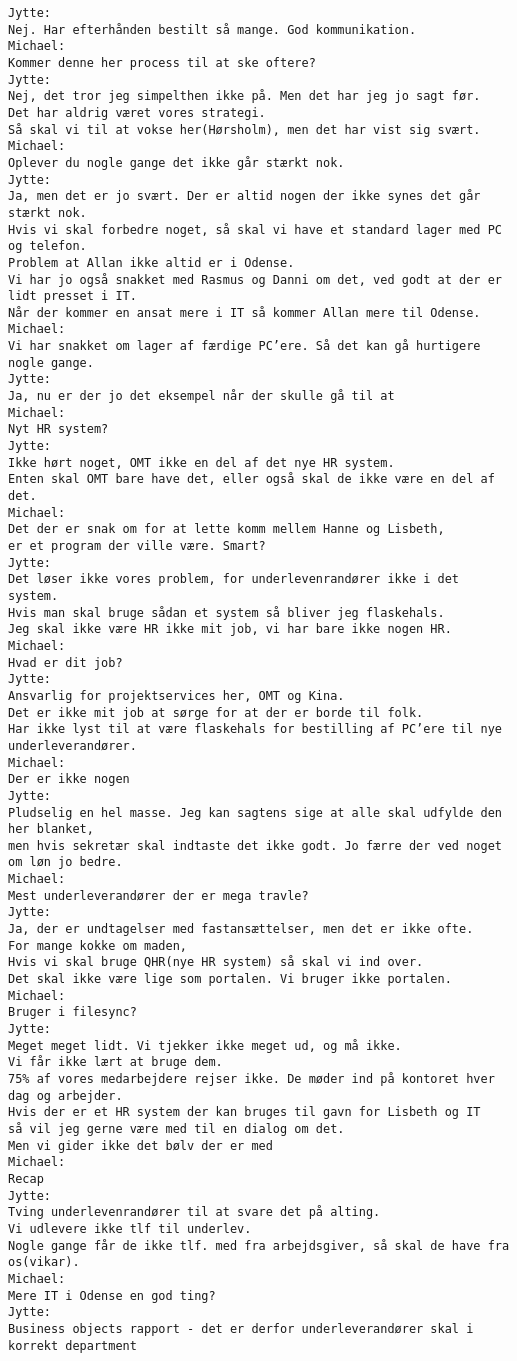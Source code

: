 \begin{verbatim}
Jytte:
Nej. Har efterhånden bestilt så mange. God kommunikation.
Michael:
Kommer denne her process til at ske oftere?
Jytte:
Nej, det tror jeg simpelthen ikke på. Men det har jeg jo sagt før.
Det har aldrig været vores strategi.
Så skal vi til at vokse her(Hørsholm), men det har vist sig svært.
Michael:
Oplever du nogle gange det ikke går stærkt nok.
Jytte:
Ja, men det er jo svært. Der er altid nogen der ikke synes det går stærkt nok.
Hvis vi skal forbedre noget, så skal vi have et standard lager med PC og telefon.
Problem at Allan ikke altid er i Odense.
Vi har jo også snakket med Rasmus og Danni om det, ved godt at der er lidt presset i IT.
Når der kommer en ansat mere i IT så kommer Allan mere til Odense.
Michael:
Vi har snakket om lager af færdige PC’ere. Så det kan gå hurtigere nogle gange.
Jytte:
Ja, nu er der jo det eksempel når der skulle gå til at 
Michael:
Nyt HR system?
Jytte:
Ikke hørt noget, OMT ikke en del af det nye HR system.
Enten skal OMT bare have det, eller også skal de ikke være en del af det.
Michael:
Det der er snak om for at lette komm mellem Hanne og Lisbeth,
er et program der ville være. Smart?
Jytte:
Det løser ikke vores problem, for underlevenrandører ikke i det system.
Hvis man skal bruge sådan et system så bliver jeg flaskehals.
Jeg skal ikke være HR ikke mit job, vi har bare ikke nogen HR. 
Michael:
Hvad er dit job?
Jytte:
Ansvarlig for projektservices her, OMT og Kina.
Det er ikke mit job at sørge for at der er borde til folk.
Har ikke lyst til at være flaskehals for bestilling af PC’ere til nye underleverandører. 
Michael:
Der er ikke nogen 
Jytte:
Pludselig en hel masse. Jeg kan sagtens sige at alle skal udfylde den her blanket,
men hvis sekretær skal indtaste det ikke godt. Jo færre der ved noget om løn jo bedre.
Michael:
Mest underleverandører der er mega travle?
Jytte:
Ja, der er undtagelser med fastansættelser, men det er ikke ofte.
For mange kokke om maden, 
Hvis vi skal bruge QHR(nye HR system) så skal vi ind over.
Det skal ikke være lige som portalen. Vi bruger ikke portalen. 
Michael:
Bruger i filesync?
Jytte:
Meget meget lidt. Vi tjekker ikke meget ud, og må ikke.
Vi får ikke lært at bruge dem.
75% af vores medarbejdere rejser ikke. De møder ind på kontoret hver dag og arbejder.
Hvis der er et HR system der kan bruges til gavn for Lisbeth og IT
så vil jeg gerne være med til en dialog om det. 
Men vi gider ikke det bølv der er med 
Michael:
Recap
Jytte:
Tving underlevenrandører til at svare det på alting.
Vi udlevere ikke tlf til underlev.
Nogle gange får de ikke tlf. med fra arbejdsgiver, så skal de have fra os(vikar).
Michael:
Mere IT i Odense en god ting?
Jytte:
Business objects rapport - det er derfor underleverandører skal i korrekt department


\end{verbatim}
